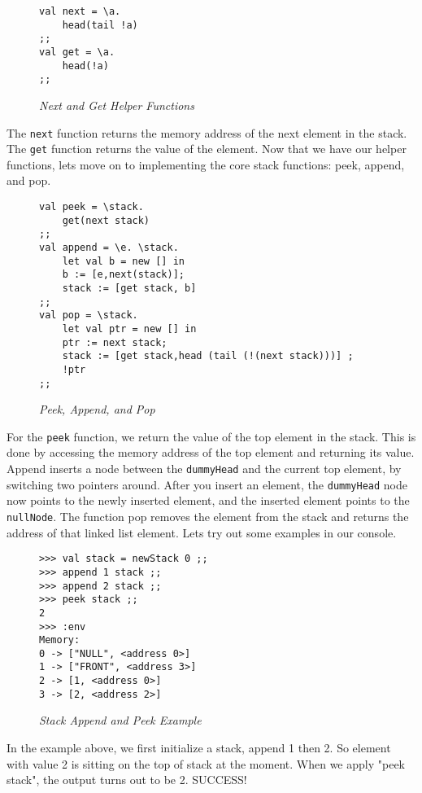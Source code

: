 \documentclass{article}
\begin{document}
\begin{figure}[H]
    \begin{lstlisting}
val next = \a. 
    head(tail !a) 
;;
val get = \a. 
    head(!a) 
;;
    \end{lstlisting}
    \caption{\textit{Next and Get Helper Functions}}
\end{figure}

\noindent
The \texttt{next} function returns the memory address of the next element in the stack. The \texttt{get} function returns the value of the element. Now that we have our helper functions, lets move on to implementing the core stack functions: peek, append, and pop.

\begin{figure}[H]
    \begin{lstlisting}
val peek = \stack. 
    get(next stack)
;;
val append = \e. \stack.
    let val b = new [] in
    b := [e,next(stack)];
    stack := [get stack, b] 
;;
val pop = \stack. 
    let val ptr = new [] in
    ptr := next stack;
    stack := [get stack,head (tail (!(next stack)))] ;
    !ptr
;;
    \end{lstlisting}
    \caption{\textit{Peek, Append, and Pop}}
\end{figure}

\noindent 
For the \texttt{peek} function, we return the value of the top element in the stack. This is done by accessing the memory address of the top element and returning its value. Append inserts a node between the \texttt{dummyHead} and the current top element, by switching two pointers around. After you insert an element, the \texttt{dummyHead} node now points to the newly inserted element, and the inserted element points to the \texttt{nullNode}. The function pop removes the element from the stack and returns the address of that linked list element. Lets try out some examples in our console.

\begin{figure}[H]
    \begin{lstlisting}
>>> val stack = newStack 0 ;;
>>> append 1 stack ;;
>>> append 2 stack ;;
>>> peek stack ;;
2
>>> :env
Memory:
0 -> ["NULL", <address 0>]
1 -> ["FRONT", <address 3>]
2 -> [1, <address 0>]
3 -> [2, <address 2>]
    \end{lstlisting}
    \caption{\textit{Stack Append and Peek Example}}
\end{figure}
\noindent
In the example above, we first initialize a stack, append 1 then 2. So element with value 2 is sitting on the top of stack at the moment. When we apply "peek stack", the output turns out to be 2. SUCCESS! 
\end{document}
